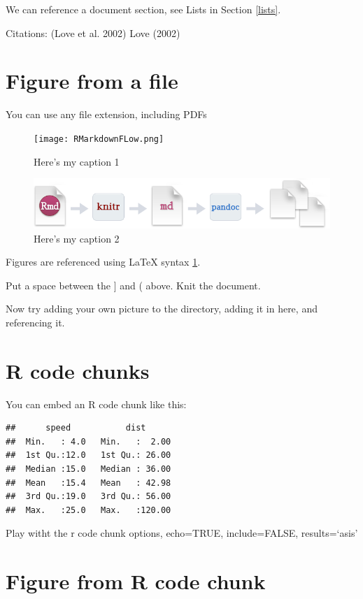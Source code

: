 \documentclass[12pt,]{article}
\begin{document}
We can reference a document section, see Lists in Section \ref{lists}.

Citations: (Love et al. 2002) Love (2002)

\section{Figure from a file}\label{figure-from-a-file}

You can use any file extension, including PDFs

\begin{figure}[htbp]
\centering
\texttt{[image: RMarkdownFLow.png]}
\caption{Here's my caption 1\label{fig:fig_example1}}
\end{figure}

\begin{figure}[htbp]
\centering
\includegraphics{./Figures/RMarkdownFLow1.png}
\caption{Here's my caption 2\label{fig:fig_example2}}
\end{figure}

Figures are referenced using LaTeX syntax \ref{fig:fig_example1}.

Put a space between the {]} and ( above. Knit the document.

Now try adding your own picture to the directory, adding it in here, and
referencing it.

\section{R code chunks}\label{r-code-chunks}

You can embed an R code chunk like this: \FloatBarrier

\begin{verbatim}
##      speed           dist       
##  Min.   : 4.0   Min.   :  2.00  
##  1st Qu.:12.0   1st Qu.: 26.00  
##  Median :15.0   Median : 36.00  
##  Mean   :15.4   Mean   : 42.98  
##  3rd Qu.:19.0   3rd Qu.: 56.00  
##  Max.   :25.0   Max.   :120.00
\end{verbatim}

Play witht the r code chunk options, echo=TRUE, include=FALSE,
results=`asis'

\section{Figure from R code chunk}\label{figure-from-r-code-chunk}
\end{document}
